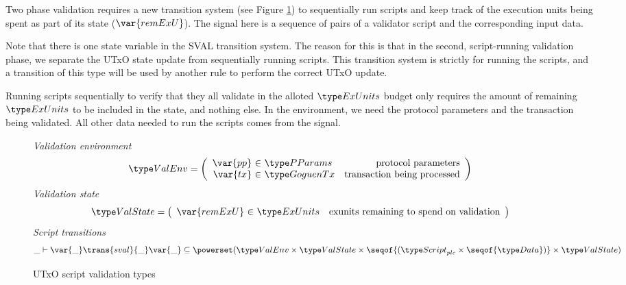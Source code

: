 Two phase validation requires a new transition system
(see Figure \ref{fig:ts-types:utxos}) to sequentially run
scripts and keep track of the execution units being spent as part of its state
($\var{remExU}$). The signal here is a sequence of pairs of a validator
script and the corresponding input data.

Note that there is one state variable in the SVAL transition system. The reason
for this is that in the second, script-running validation phase, we separate
the UTxO state update from sequentially running scripts. This transition
system is strictly for running the scripts, and a transition of this type
will be used by another rule to perform the correct UTxO update.

Running scripts sequentially
to verify that they all validate in the alloted $\ExUnits$ budget only requires
the amount of remaining $\ExUnits$ to be included in the state, and nothing else.
In the environment, we need the protocol parameters and the
transaction being validated. All other data needed
to run the scripts comes from the signal.

\begin{figure}[htb]
  \emph{Validation environment}
  \begin{equation*}
    \ValEnv =
    \left(
      \begin{array}{r@{~\in~}lr}
        \var{pp} & \PParams & \text{protocol parameters}\\
        \var{tx} & \GoguenTx & \text{transaction being processed} \\
      \end{array}
    \right)
  \end{equation*}
  \emph{Validation state}
  \begin{equation*}
    \ValState =
    \left(
      \begin{array}{r@{~\in~}lr}
        \var{remExU} & \ExUnits & \text{exunits remaining to spend on validation} \\
      \end{array}
    \right)
  \end{equation*}
  \emph{Script transitions}
  \begin{equation*}
    \_ \vdash
    \var{\_} \trans{sval}{\_} \var{\_}
    \subseteq \powerset (\ValEnv \times \ValState \times \seqof{(\ScriptPlutus\times\seqof{\Data})} \times \ValState)
  \end{equation*}
  \caption{UTxO script validation types}
  \label{fig:ts-types:utxos}
\end{figure}

